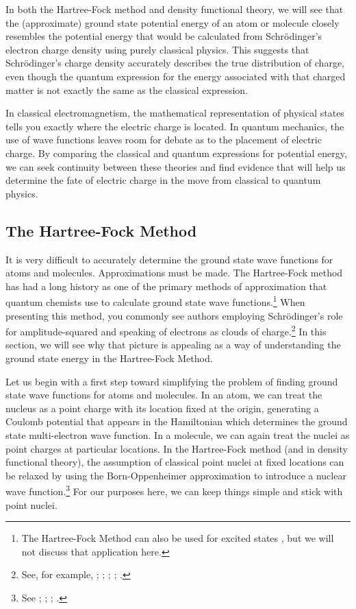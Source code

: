 \documentclass[12pt,onecolumn,secnumarabic,amsmath,amssymb,balancelastpage,nofootinbib]{article}
\begin{document}
In both the Hartree-Fock method and density functional theory, we will see that the (approximate) ground state potential energy of an atom or molecule closely resembles the potential energy that would be calculated from Schr\"{o}dinger's electron charge density using purely classical physics.  This suggests that Schr\"{o}dinger's charge density accurately describes the true distribution of charge, even though the quantum expression for the energy associated with that charged matter is not exactly the same as the classical expression.

In classical electromagnetism, the mathematical representation of physical states tells you exactly where the electric charge is located.  In quantum mechanics, the use of wave functions leaves room for debate as to the placement of electric charge.  By comparing the classical and quantum expressions for potential energy, we can seek continuity between these theories and find evidence that will help us determine the fate of electric charge in the move from classical to quantum physics.

\subsection{The Hartree-Fock Method}\label{HFsection}

It is very difficult to accurately determine the ground state wave functions for atoms and molecules.  Approximations must be made.  The Hartree-Fock method has had a long history as one of the primary methods of approximation that quantum chemists use to calculate ground state wave functions.\footnote{The Hartree-Fock Method can also be used for excited states \cite[sec.\ 2.2.6]{szaboQC}, but we will not discuss that application here.}  When presenting this method, you commonly see authors employing Schr\"{o}dinger's role for amplitude-squared and speaking of electrons as clouds of charge.\footnote{See, for example, \cite[ch.\ 9]{slatervol1}; \cite[sec.\ 17.2]{slatervol2}; \cite[pg.\ 432]{blinder1965}; \cite[sec.\ 2.3.6]{szaboQC}; \cite[sec.\ 11.1]{levineQC}.}  In this section, we will see why that picture is appealing as a way of understanding the ground state energy in the Hartree-Fock Method.

Let us begin with a first step toward simplifying the problem of finding ground state wave functions for atoms and molecules.  In an atom, we can treat the nucleus as a point charge with its location fixed at the origin, generating a Coulomb potential that appears in the Hamiltonian which determines the ground state multi-electron wave function.  In a molecule, we can again treat the nuclei as point charges at particular locations.  In the Hartree-Fock method (and in density functional theory), the assumption of classical point nuclei at fixed locations can be relaxed by using the Born-Oppenheimer approximation to introduce a nuclear wave function.\footnote{See \cite[sec.\ 2.1.2]{szaboQC}; \cite[sec.\ 10.1]{mcquarrieQC}; \cite[ch.\ 8]{atkins2011}; \cite[sec.\ 13.1]{levineQC}.}  For our purposes here, we can keep things simple and stick with point nuclei.
\end{document}
